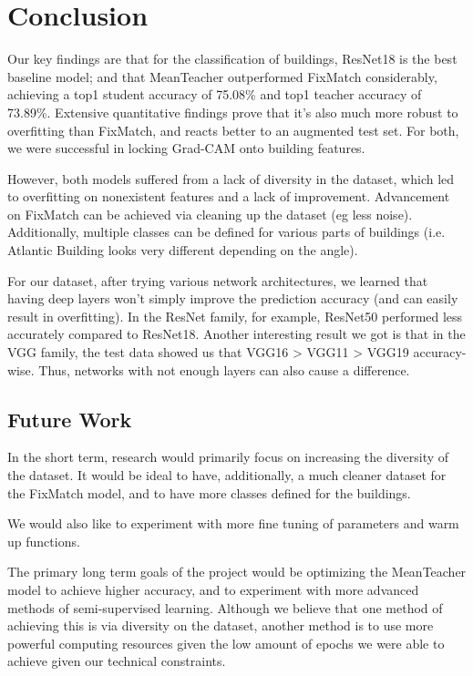 \documentclass{article}
\begin{document}
\section{Conclusion}

Our key findings are that for the classification of buildings, ResNet18 is the best baseline model; and that MeanTeacher outperformed FixMatch considerably, achieving a top1 student accuracy of 75.08\% and top1 teacher accuracy of 73.89\%. Extensive quantitative findings prove that it's also much more robust to overfitting than FixMatch, and reacts better to an augmented test set. For both, we were successful in locking Grad-CAM onto building features. 

However, both models suffered from a lack of diversity in the dataset, which led to overfitting on nonexistent features and a lack of improvement. Advancement on FixMatch can be achieved via cleaning up the dataset (eg less noise). Additionally, multiple classes can be defined for various parts of buildings (i.e. Atlantic Building looks very different depending on the angle).

For our dataset, after trying various network architectures, we learned that having deep layers won’t simply improve the prediction accuracy (and can easily result in overfitting). In the ResNet family, for example, ResNet50 performed less accurately compared to ResNet18. Another interesting result we got is that in the VGG family, the test data showed us that VGG16 > VGG11 > VGG19 accuracy-wise. Thus, networks with not enough layers can also cause a difference.  

\subsection*{Future Work}

In the short term, research would primarily focus on increasing the diversity of the dataset. It would be ideal to have, additionally, a much cleaner dataset for the FixMatch model, and to have more classes defined for the buildings.

We would also like to experiment with more fine tuning of parameters and warm up functions.

The primary long term goals of the project would be optimizing the MeanTeacher model to achieve higher accuracy, and to experiment with more advanced methods of semi-supervised learning. Although we believe that one method of achieving this is via diversity on the dataset, another method is to use more powerful computing resources given the low amount of epochs we were able to achieve given our technical constraints.
\end{document}
